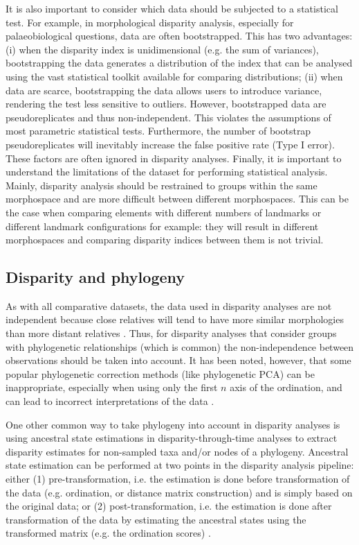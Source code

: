 \documentclass[12pt,letterpaper]{article}
\begin{document}
It is also important to consider which data should be subjected to a statistical test.
For example, in morphological disparity analysis, especially for palaeobiological questions, data are often bootstrapped.
This has two advantages: (i) when the disparity index is unidimensional (e.g. the sum of variances), bootstrapping the data generates a distribution of the index that can be analysed using the vast statistical toolkit available for comparing distributions; (ii) when data are scarce, bootstrapping the data allows users to introduce variance, rendering the test less sensitive to outliers.
However, bootstrapped data are pseudoreplicates and thus non-independent.
This violates the assumptions of most parametric statistical tests.
Furthermore, the number of bootstrap pseudoreplicates will inevitably increase the false positive rate (Type I error).
These factors are often ignored in disparity analyses.
Finally, it is important to understand the limitations of the dataset for performing statistical analysis.
Mainly, disparity analysis should be restrained to groups within the same morphospace and are more difficult between different morphospaces.
This can be the case when comparing elements with different numbers of landmarks or different landmark configurations for example: they will result in different morphospaces and comparing disparity indices between them is not trivial.


\subsection{Disparity and phylogeny} \label{section:phylo}

As with all comparative datasets, the data used in disparity analyses are not independent because close relatives will tend to have more similar morphologies than more distant relatives \citep{Harvey1998-xg}.
Thus, for disparity analyses that consider groups with phylogenetic relationships (which is common) the non-independence between observations should be taken into account.
It has been noted, however, that some popular phylogenetic correction methods (like phylogenetic PCA) can be inappropriate, especially when using only the first $n$ axis of the ordination, and can lead to incorrect interpretations of the data \citep[such as wrongly supporting ``early burst'' type patterns;][]{Uyeda2015}.

One other common way to take phylogeny into account in disparity analyses is using ancestral state estimations in disparity-through-time analyses to extract disparity estimates for non-sampled taxa and/or nodes of a phylogeny.
Ancestral state estimation can be performed at two points in the disparity analysis pipeline: either (1) pre-transformation, i.e. the estimation is done before transformation of the data (e.g. ordination, or distance matrix construction) and is simply based on the original data; or (2) post-transformation, i.e. the estimation is done after transformation of the data by estimating the ancestral states using the transformed matrix (e.g. the ordination scores) \citep{lloyd2018}.
\end{document}

